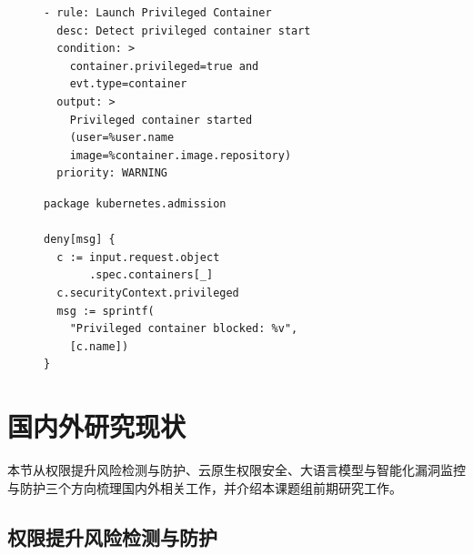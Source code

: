\begin{figure}[htb]
    \centering
    \setlength{\abovecaptionskip}{3pt}
    \setlength{\belowcaptionskip}{0pt}
    \begin{minipage}[t]{0.48\textwidth}
    \begin{tcolorbox}[enhanced,colback=gray!3,colframe=gray!55,boxrule=0.4pt,arc=1mm,left=2mm,right=2mm,top=0.5mm,bottom=0.5mm,title={\small Falco 运行时监控规则示例},fonttitle=\bfseries,coltitle=black]
    \begin{BVerbatim}[fontsize=\scriptsize,baselinestretch=0.8]
- rule: Launch Privileged Container
  desc: Detect privileged container start
  condition: >
    container.privileged=true and
    evt.type=container
  output: >
    Privileged container started
    (user=%user.name
    image=%container.image.repository)
  priority: WARNING
    \end{BVerbatim}
    \end{tcolorbox}
    \end{minipage}%
    \hfill
    \begin{minipage}[t]{0.48\textwidth}
    \begin{tcolorbox}[enhanced,colback=gray!3,colframe=gray!55,boxrule=0.4pt,arc=1mm,left=2mm,right=2mm,top=0.5mm,bottom=0.5mm,title={\small OPA/Gatekeeper 准入控制策略示例},fonttitle=\bfseries,coltitle=black]
    \begin{BVerbatim}[fontsize=\scriptsize,baselinestretch=0.8]
package kubernetes.admission

deny[msg] {
  c := input.request.object
       .spec.containers[_]
  c.securityContext.privileged
  msg := sprintf(
    "Privileged container blocked: %v",
    [c.name])
}
    \end{BVerbatim}
    \end{tcolorbox}
    \end{minipage}
    \label{fig:falco-opa-examples}
\end{figure}

\section{国内外研究现状}

本节从权限提升风险检测与防护、云原生权限安全、大语言模型与智能化漏洞监控与防护三个方向梳理国内外相关工作，并介绍本课题组前期研究工作。

\subsection{权限提升风险检测与防护}

